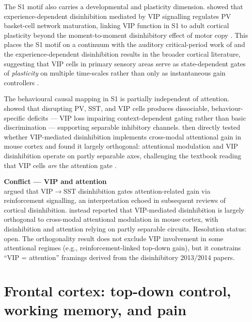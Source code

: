 \documentclass[11pt]{article}
\let\origrightarrow\rightarrow
\def\rightarrow{\ensuremath{\origrightarrow}}
\begin{document}
The S1 motif also carries a developmental and plasticity dimension. \citet{Donato2013} showed that experience-dependent disinhibition mediated by VIP signalling regulates PV basket-cell network maturation, linking VIP function in S1 to adult cortical plasticity beyond the moment-to-moment disinhibitory effect of motor copy \citep{Donato2013, Lee2013}. This places the S1 motif on a continuum with the auditory critical-period work of \citet{Takesian2018} and the experience-dependent disinhibition results in the broader cortical literature, suggesting that VIP cells in primary sensory areas serve as state-dependent gates of \textit{plasticity} on multiple time-scales rather than only as instantaneous gain controllers \citep{Takesian2018, Donato2013, Krabbe2019}.

The behavioural causal mapping in S1 is partially independent of attention. \citet{Kuchibhotla2017} showed that disrupting PV, SST, and VIP cells produces dissociable, behaviour-specific deficits --- VIP loss impairing context-dependent gating rather than basic discrimination --- supporting separable inhibitory channels. \citet{Myersjoseph2024} then directly tested whether VIP-mediated disinhibition implements cross-modal attentional gain in mouse cortex and found it largely orthogonal: attentional modulation and VIP disinhibition operate on partly separable axes, challenging the textbook reading that VIP cells \textit{are} the attention gate \citep{Myersjoseph2024, Pi2013}.

\begin{framed}
\textbf{Conflict --- VIP and attention}\\
\citet{Pi2013} argued that VIP\rightarrow SST disinhibition gates attention-related gain via reinforcement signalling, an interpretation echoed in subsequent reviews of cortical disinhibition. \citet{Myersjoseph2024} instead reported that VIP-mediated disinhibition is largely orthogonal to cross-modal attentional modulation in mouse cortex, with disinhibition and attention relying on partly separable circuits. Resolution status: open. The orthogonality result does not exclude VIP involvement in some attentional regimes (e.g., reinforcement-linked top-down gain), but it constrains ``VIP = attention'' framings derived from the disinhibitory 2013/2014 papers.
\end{framed}

\section{Frontal cortex: top-down control, working memory, and pain}
\end{document}
